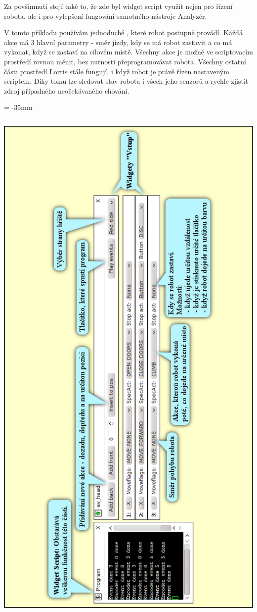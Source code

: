 \documentclass[12pt, a4paper, oneside]{article}
\begin{document}
Za povšimnutí stojí také to, že zde byl widget script využit nejen pro řízení robota, ale i pro vylepšení fungování samotného nástroje Analyzér.

V tomto příkladu používám jednoduché , které robot postupně provádí. Každá akce má 3 hlavní parametry - směr jízdy, kdy se má robot zastavit a co má vykonat, když se zastaví na cílovém místě. Všechny akce je možné ve scriptovacím prostředí rovnou měnit, bez nutnosti přeprogramovávat robota. Všechny ostatní části prostředí Lorris stále fungují, i když robot je právě řízen nastaveným scriptem. Díky tomu lze sledovat stav robota i všech jeho senzorů a rychle zjistit zdroj případného neočekávaného chování.

\newpage
\enlargethispage{400mm}
\voffset = -35mm %
\begin{center}
\includegraphics[height=750pt]{img/control_david.png}
\end{center}
\end{document}
